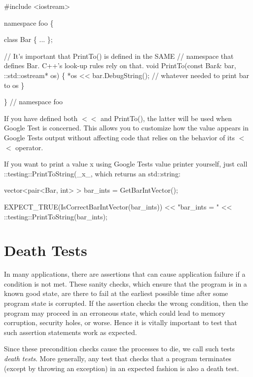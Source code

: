 \begin{DoxyCode}
#include <iostream>

namespace foo \{

class Bar \{ ... \};

// It's important that PrintTo() is defined in the SAME
// namespace that defines Bar.  C++'s look-up rules rely on that.
void PrintTo(const Bar& bar, ::std::ostream* os) \{
  *os << bar.DebugString();  // whatever needed to print bar to os
\}

\}  // namespace foo
\end{DoxyCode}


If you have defined both {\ttfamily $<$$<$} and {\ttfamily Print\+To()}, the latter will be used when Google Test is concerned. This allows you to customize how the value appears in Google Test\textquotesingle{}s output without affecting code that relies on the behavior of its {\ttfamily $<$$<$} operator.

If you want to print a value {\ttfamily x} using Google Test\textquotesingle{}s value printer yourself, just call {\ttfamily \+::testing\+::\+Print\+To\+String(}\+\_\+x\+\_\+{\ttfamily )}, which returns an {\ttfamily std\+::string}\+:


\begin{DoxyCode}
vector<pair<Bar, int> > bar\_ints = GetBarIntVector();

EXPECT\_TRUE(IsCorrectBarIntVector(bar\_ints))
    << "bar\_ints = " << ::testing::PrintToString(bar\_ints);
\end{DoxyCode}


\section*{Death Tests}

In many applications, there are assertions that can cause application failure if a condition is not met. These sanity checks, which ensure that the program is in a known good state, are there to fail at the earliest possible time after some program state is corrupted. If the assertion checks the wrong condition, then the program may proceed in an erroneous state, which could lead to memory corruption, security holes, or worse. Hence it is vitally important to test that such assertion statements work as expected.

Since these precondition checks cause the processes to die, we call such tests {\itshape death tests}. More generally, any test that checks that a program terminates (except by throwing an exception) in an expected fashion is also a death test.

